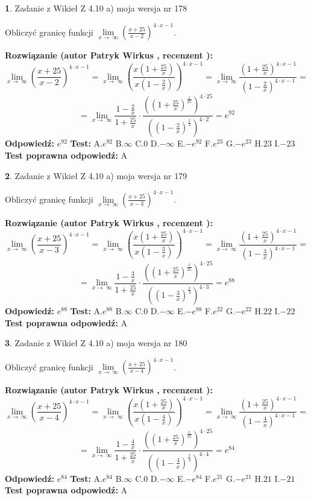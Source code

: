 \documentclass[12pt, a4paper]{article}
\theoremstyle{definition} %
\newtheorem{zad}{}
\newcommand{\zadStart}[1]{\begin{zad}#1\newline}
\newcommand{\zadStop}{\end{zad}}
\newcommand{\rozwStart}[2]{\noindent \textbf{Rozwiązanie (autor #1 , recenzent #2): }\newline}
\newcommand{\rozwStop}{\newline}
\newcommand{\odpStart}{\noindent \textbf{Odpowiedź:}\newline}
\newcommand{\odpStop}{\newline}
\newcommand{\testStart}{\noindent \textbf{Test:}\newline}
\newcommand{\testStop}{\newline}
\newcommand{\kluczStart}{\noindent \textbf{Test poprawna odpowiedź:}\newline}
\newcommand{\kluczStop}{\newline}
\begin{document}
\zadStart{Zadanie z Wikieł Z 4.10 a) moja wersja nr 178}

Obliczyć granicę funkcji  $\lim\limits_{x\to\ \infty}(\frac{x+25}{x-2})^{4\cdot x-1}$.
\zadStop
\rozwStart{Patryk Wirkus}{}
$$\lim\limits_{x\to\ \infty}(\frac{x+25}{x-2})^{4\cdot x-1} = \lim\limits_{x\to\ \infty}(\frac{x(1+\frac{25}{x})}{x(1-\frac{2}{x})})^{4\cdot x-1}=\lim\limits_{x\to\ \infty}\frac{(1+\frac{25}{x})^{4\cdot x-1}}{(1-\frac{2}{x})^{4\cdot x-1}}=$$
$$=\lim\limits_{x\to\ \infty}\frac{1-\frac{2}{x}}{1+\frac{25}{x}}\cdot\frac{((1+\frac{25}{x})^{\frac{x}{25}})^{4\cdot25}}{((1-\frac{2}{x})^{\frac{x}{2}})^{4\cdot2}}=e^{92}$$
\rozwStop
\odpStart
$e^{92}$
\odpStop
\testStart
A.$e^{92}$ B.$\infty$ C.$0$ D.$-\infty$ E.$-e^{92}$
F.$e^{23}$ G.$-e^{23}$
H.$23$
I.$-23$
\testStop
\kluczStart
A
\kluczStop



\zadStart{Zadanie z Wikieł Z 4.10 a) moja wersja nr 179}

Obliczyć granicę funkcji  $\lim\limits_{x\to\ \infty}(\frac{x+25}{x-3})^{4\cdot x-1}$.
\zadStop
\rozwStart{Patryk Wirkus}{}
$$\lim\limits_{x\to\ \infty}(\frac{x+25}{x-3})^{4\cdot x-1} = \lim\limits_{x\to\ \infty}(\frac{x(1+\frac{25}{x})}{x(1-\frac{3}{x})})^{4\cdot x-1}=\lim\limits_{x\to\ \infty}\frac{(1+\frac{25}{x})^{4\cdot x-1}}{(1-\frac{3}{x})^{4\cdot x-1}}=$$
$$=\lim\limits_{x\to\ \infty}\frac{1-\frac{3}{x}}{1+\frac{25}{x}}\cdot\frac{((1+\frac{25}{x})^{\frac{x}{25}})^{4\cdot25}}{((1-\frac{3}{x})^{\frac{x}{3}})^{4\cdot3}}=e^{88}$$
\rozwStop
\odpStart
$e^{88}$
\odpStop
\testStart
A.$e^{88}$ B.$\infty$ C.$0$ D.$-\infty$ E.$-e^{88}$
F.$e^{22}$ G.$-e^{22}$
H.$22$
I.$-22$
\testStop
\kluczStart
A
\kluczStop



\zadStart{Zadanie z Wikieł Z 4.10 a) moja wersja nr 180}

Obliczyć granicę funkcji  $\lim\limits_{x\to\ \infty}(\frac{x+25}{x-4})^{4\cdot x-1}$.
\zadStop
\rozwStart{Patryk Wirkus}{}
$$\lim\limits_{x\to\ \infty}(\frac{x+25}{x-4})^{4\cdot x-1} = \lim\limits_{x\to\ \infty}(\frac{x(1+\frac{25}{x})}{x(1-\frac{4}{x})})^{4\cdot x-1}=\lim\limits_{x\to\ \infty}\frac{(1+\frac{25}{x})^{4\cdot x-1}}{(1-\frac{4}{x})^{4\cdot x-1}}=$$
$$=\lim\limits_{x\to\ \infty}\frac{1-\frac{4}{x}}{1+\frac{25}{x}}\cdot\frac{((1+\frac{25}{x})^{\frac{x}{25}})^{4\cdot25}}{((1-\frac{4}{x})^{\frac{x}{4}})^{4\cdot4}}=e^{84}$$
\rozwStop
\odpStart
$e^{84}$
\odpStop
\testStart
A.$e^{84}$ B.$\infty$ C.$0$ D.$-\infty$ E.$-e^{84}$
F.$e^{21}$ G.$-e^{21}$
H.$21$
I.$-21$
\testStop
\kluczStart
A
\kluczStop
\end{document}
